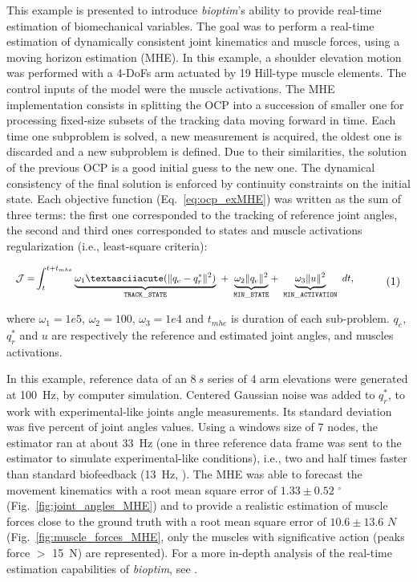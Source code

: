 This example is presented to introduce \textit{bioptim}'s ability to provide real-time estimation of biomechanical variables.
The goal was to perform a real-time estimation of dynamically consistent joint kinematics and muscle forces, using a moving horizon estimation (MHE). 
In this example, a shoulder elevation motion was performed with a 4-DoFs arm actuated by 19 Hill-type muscle elements.
The control inputs of the model were the muscle activations.
The MHE implementation consists in splitting the OCP into a succession of smaller one for processing fixed-size subsets of the tracking data moving forward in time. 
Each time one subproblem is solved, a new measurement is acquired, the oldest one is discarded and a new subproblem is defined. 
Due to their similarities, the solution of the previous OCP is a good initial guess to the new one. 
The dynamical consistency of the final solution is enforced by continuity constraints on the initial state. 
Each objective function (Eq.~\ref{eq:ocp_exMHE}) was written as the sum of three terms: the first one corresponded to the tracking of reference joint angles, the second and third ones corresponded to states and muscle activations regularization (i.e., least-square criteria): 

\[ 
\resizebox{0.9\columnwidth}{!}{$ 
\begin{aligned}
\mathcal{J} = &\int_t^{t+t_{mhe}}\underbrace{\omega_1´(\|q_{e} - q^*_{r}\|^{2})}_{\mathtt{TRACK\_STATE}}~ 
+ ~ \underbrace{\omega_2\|q_{e}\|^2}_{\mathtt{MIN\_STATE}} 
+ ~ \underbrace{\omega_3\|u\|^2}_{\mathtt{MIN\_ACTIVATION}}~dt, 
\end{aligned}  
$}  
\addtag  
\label{eq:ocp_exMHE}  
\]  

\noindent where $\omega_1 =1e5$, $\omega_2 = 100$, $\omega_3 = 1e4$ and $t_{mhe}$ is duration of each sub-problem. $q_{e}$, $q^*_{r}$  and $u$ are respectively the reference and estimated joint angles, and muscles activations. 

In this example, reference data of an $8~s$ series of 4 arm elevations were generated at 100~Hz, by computer simulation.
Centered Gaussian noise was added to $q^*_{r}$, to work with experimental-like joints angle measurements.
Its standard deviation was five percent of joint angles values.
Using a windows size of 7 nodes, the estimator ran at about 33~Hz (one in three reference data frame was sent to the estimator to simulate experimental-like conditions), i.e., two and half times faster than standard biofeedback (13~Hz, \cite{kannape2013biofeedback}).
The MHE was able to forecast the movement kinematics with a root mean square error of $1.33\pm0.52\text{~}^{\circ}$ (Fig.~\ref{fig:joint_angles_MHE}) and to provide a realistic estimation of muscle forces close to the ground truth with a root mean square error of $10.6\pm13.6\text{~}N$ (Fig.~\ref{fig:muscle_forces_MHE}, only the muscles with significative action (peaks force $>$ 15~N) are represented). 
For a more in-depth analysis of the real-time estimation capabilities of \textit{bioptim}, see \cite{bailly2020real}.
 
